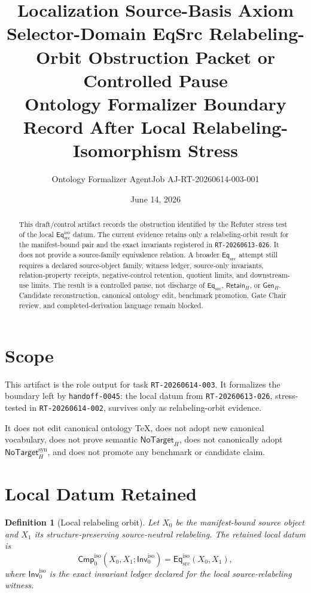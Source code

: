 \documentclass[11pt]{article}
\title{\textbf{Localization Source-Basis Axiom Selector-Domain EqSrc Relabeling-Orbit Obstruction Packet or Controlled Pause}\\[0.35em]
\large Ontology Formalizer Boundary Record After Local Relabeling-Isomorphism Stress}
\author{Ontology Formalizer AgentJob AJ-RT-20260614-003-001}
\date{June 14, 2026}
\newcommand{\Inv}{\mathsf{Inv}_{0}^{\mathrm{iso}}}
\newcommand{\Cmp}{\mathsf{Cmp}_{0}^{\mathrm{iso}}}
\newcommand{\EqSrc}{\mathsf{Eq}_{\mathrm{src}}}
\newcommand{\EqIso}{\mathsf{Eq}_{\mathrm{src}}^{\mathrm{iso}}}
\newcommand{\GenH}{\mathsf{Gen}_{H}}
\newcommand{\RetainH}{\mathsf{Retain}_{H}}
\newcommand{\NoTargetH}{\mathsf{NoTarget}_{H}}
\newcommand{\NoTargetSyn}{\mathsf{NoTarget}_{H}^{\mathrm{syn}}}
\newtheorem{definitionblock}{Definition}
\begin{document}
\maketitle

\begin{abstract}
This draft/control artifact records the obstruction identified by the
Refuter stress test of the local \(\EqIso\) datum. The current evidence
retains only a relabeling-orbit result for the manifest-bound pair and the
exact invariants registered in \texttt{RT-20260613-026}. It does not
provide a source-family equivalence relation. A broader \(\EqSrc\)
attempt still requires a declared source-object family, witness ledger,
source-only invariants, relation-property receipts, negative-control
retention, quotient limits, and downstream-use limits. The result is a
controlled pause, not discharge of \(\EqSrc\), \(\RetainH\), or
\(\GenH\). Candidate reconstruction, canonical ontology edit, benchmark
promotion, Gate Chair review, and completed-derivation language remain
blocked.
\end{abstract}

\section{Scope}

This artifact is the role output for task \texttt{RT-20260614-003}. It
formalizes the boundary left by \texttt{handoff-0045}: the local datum
from \texttt{RT-20260613-026}, stress-tested in
\texttt{RT-20260614-002}, survives only as relabeling-orbit evidence.

It does not edit canonical ontology TeX, does not adopt new canonical
vocabulary, does not prove semantic \(\NoTargetH\), does not canonically
adopt \(\NoTargetSyn\), and does not promote any benchmark or candidate
claim.

\section{Local Datum Retained}

\begin{definitionblock}[Local relabeling orbit]
Let \(X_{0}\) be the manifest-bound source object and \(X_{1}\) its
structure-preserving source-neutral relabeling. The retained local datum is
\[
    \Cmp(X_{0},X_{1};\Inv)=\EqIso(X_{0},X_{1}),
\]
where \(\Inv\) is the exact invariant ledger declared for the local
source-relabeling witness.
\end{definitionblock}
\end{document}
